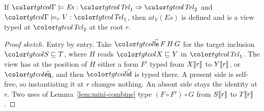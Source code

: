 \begin{lemma}\label{lem:mini-apply}
If $\entj{\Gamma}{\mathit{Es}}{\tel_1}{\tel_2}$ and $\viewjr{\Gamma}{r}{V}{\tel_1}$, then $\mathit{at}_V(\mathit{Es})$ is defined and is a view typed at $\tel_2$ at the root $r$.
\end{lemma}

\begin{proof}[Proof sketch]
Entry by entry. Take $\form{le}\,F\,H\,G$ for the target inclusion $\ple{S}{T}$, where $H$ reads $\ple{X}{Y}$ in $\tel_1$. The view has at the position of $H$ either a form $F'$ typed from $X\llbracket r\rrbracket$ to $Y\llbracket r\rrbracket$, or $\form{eq}$, and then $\form{id}$ is typed there. A present side is self-free, so instantiating it at $r$ changes nothing. An absent side stays the identity at $r$. Two uses of Lemma~\ref{lem:mini-combine} type $(F \circ F') \circ G$ from $S\llbracket r\rrbracket$ to $T\llbracket r\rrbracket$.
\end{proof}

